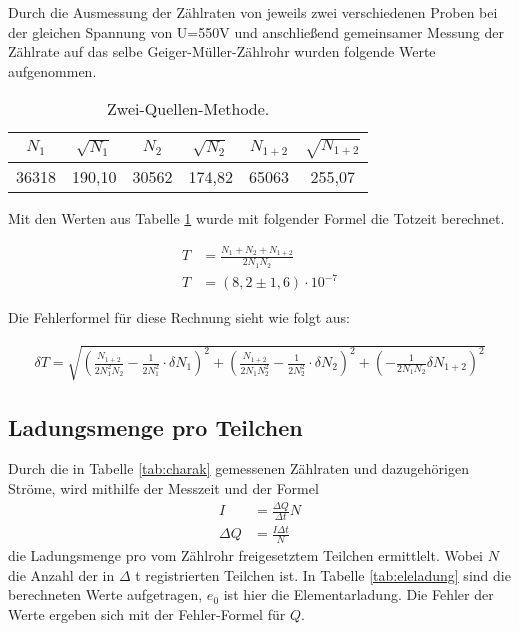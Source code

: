 Durch die Ausmessung der Zählraten von jeweils zwei verschiedenen Proben bei der gleichen Spannung von U=550V und anschließend gemeinsamer Messung der Zählrate auf das selbe Geiger-Müller-Zählrohr wurden folgende Werte aufgenommen.

\begin{table}
  \centering
  \caption{Zwei-Quellen-Methode.}
  \label{tab:zwquellen}
  \begin{tabular}{c c c c c c}
    \toprule
    $N_1$ & $\sqrt{N_1}$ & $N_2$ & $\sqrt{N_2}$ & $N_{1+2}$ & $\sqrt{N_{1+2}}$\\
    \midrule
    36318 & 190,10 & 30562 & 174,82 & 65063 & 255,07 \\
    \bottomrule
  \end{tabular}
\end{table}
\FloatBarrier

Mit den Werten aus Tabelle \ref{tab:zwquellen} wurde mit folgender Formel die Totzeit berechnet.

\begin{align*}
  T &= \frac{N_1+N_2+N_{1+2}}{2N_1N_2} \\
  T &= (8,2 \pm 1,6)\cdot 10^{-7}
\end{align*}

Die Fehlerformel für diese Rechnung sieht wie folgt aus:

\begin{align*}
  \delta T = \sqrt{(\frac{N_{1+2}}{2N_1^2N_2}-\frac{1}{2N_1^2}\cdot \delta N_1)^2 + (\frac{N_{1+2}}{2N_1N_2^2}-\frac{1}{2N_2^2}\cdot \delta N_2)^2 + (-\frac{1}{2N_1N_2} \delta N_{1+2})^2}
\end{align*}

\subsection{Ladungsmenge pro Teilchen}
\label{sec:Ladungsmenge}

Durch die in Tabelle \ref{tab:charak} gemessenen Zählraten und dazugehörigen Ströme, wird mithilfe der Messzeit und der Formel
\begin{align*}
  I &= \frac{\Delta Q}{\Delta t} N \\
  \Delta Q &= \frac{I \Delta t}{N}
\end{align*}
die Ladungsmenge pro vom Zählrohr freigesetztem Teilchen ermittlelt.
Wobei $N$ die Anzahl der in $\Delta$ t registrierten Teilchen ist.
In Tabelle \ref{tab:eleladung} sind die berechneten Werte aufgetragen, $e_0$ ist hier die Elementarladung.
Die Fehler der Werte ergeben sich mit der Fehler-Formel für $Q$.

